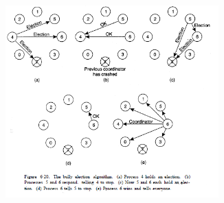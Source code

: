 \begin{minipage}{\linewidth}
	\centering\includegraphics[width=310px]{gfx/leader1.png}
	\label{img:leader1}
\end{minipage}


